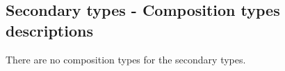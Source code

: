 \subsection{Secondary types - Composition types descriptions}



There are no composition types for the secondary types.

